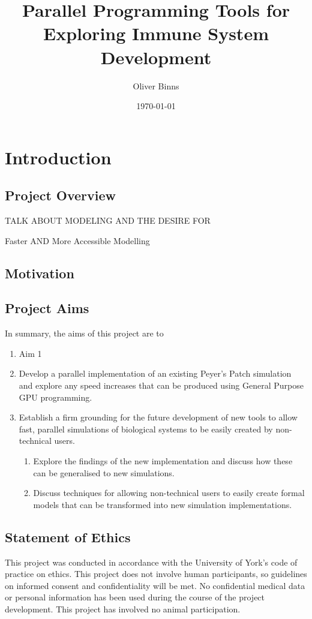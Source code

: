 \documentclass{UoYCSproject}
\title{Parallel Programming Tools for Exploring Immune System Development}
\author{Oliver Binns}
\date{\today}
\begin{document}
\maketitle
\listoffigures
\listoftables
\renewcommand*{\lstlistlistingname}{List of Listings}
\lstlistoflistings

\chapter{Introduction}
\section{Project Overview}
TALK ABOUT MODELING AND THE DESIRE FOR 

Faster AND More Accessible Modelling

\section{Motivation}

\section{Project Aims}
In summary, the aims of this project are to
\begin{enumerate}
	\item Aim 1
	\item Develop a parallel implementation of an existing Peyer's Patch simulation and explore any speed increases that can be produced using General Purpose GPU programming.
	\item Establish a firm grounding for the future development of new tools to allow fast, parallel simulations of biological systems to be easily created by non-technical users.
	\begin{enumerate}
		\item Explore the findings of the new implementation and discuss how these can be generalised to new simulations.
		\item Discuss techniques for allowing non-technical users to easily create formal models that can be transformed into new simulation implementations.
	\end{enumerate}
\end{enumerate}

\section{Statement of Ethics}
This project was conducted in accordance with the University of York's code of practice on ethics.
This project does not involve human participants, so guidelines on informed consent and confidentiality will be met. No confidential medical data or personal information has been used during the course of the project development. This project has involved no animal participation. 
\end{document}
